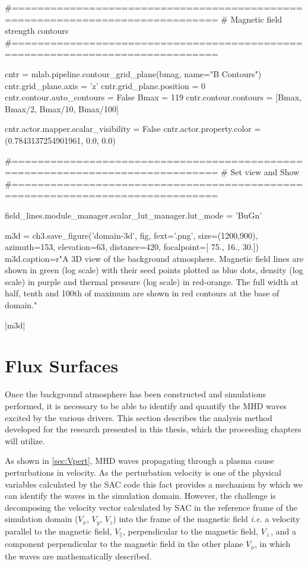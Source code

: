 \begin{pycode}[chapter3a]
#==============================================================================
# Magnetic field strength contours
#==============================================================================

cntr = mlab.pipeline.contour_grid_plane(bmag, name="B Contours")
cntr.grid_plane.axis = 'z'
cntr.grid_plane.position = 0
cntr.contour.auto_contours = False
Bmax = 119
cntr.contour.contours = [Bmax, Bmax/2, Bmax/10, Bmax/100]

cntr.actor.mapper.scalar_visibility = False
cntr.actor.property.color = (0.7843137254901961, 0.0, 0.0)

#==============================================================================
# Set view and Show
#==============================================================================

field_lines.module_manager.scalar_lut_manager.lut_mode = 'BuGn'

m3d = ch3.save_figure('domain-3d', fig, fext='.png', size=(1200,900),
                      azimuth=153, elevation=63, distance=420,
                      focalpoint=[ 75.,  16.,  30.])
m3d.caption=r"A 3D view of the background atmosphere. Magnetic field lines are shown in green (log scale) with their seed points plotted as blue dots, density (log scale) in purple and thermal pressure (log scale) in red-orange. The full width at half, tenth and 100th of maximum are shown in red contours at the base of domain."

\end{pycode}

\py[chapter3a]|m3d|

\section{Flux Surfaces}\label{sec:fluxsurfaces}

Once the background atmosphere has been constructed and simulations performed, it is necessary to be able to identify and quantify the MHD waves excited by the various drivers.
This section describes the analysis method developed for the research presented in this thesis, which the proceeding chapters will utilize.

As shown in \cref{sec:Vpert}, MHD waves propagating through a plasma cause perturbations in velocity.
As the perturbation velocity is one of the physical variables calculated by the SAC code this fact provides a mechanism by which we can identify the waves in the simulation domain.
However, the challenge is decomposing the velocity vector calculated by SAC in the reference frame of the simulation domain ($V_x$, $V_y$, $V_z$) into the frame of the magnetic field \textit{i.e.} a velocity parallel to the magnetic field, $V_\parallel$, perpendicular to the magnetic field, $V_\perp$, and a component perpendicular to the magnetic field in the other plane $V_\phi$, in which the waves are mathematically described.

